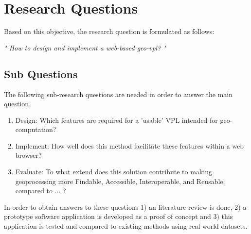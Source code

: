 \section{Research Questions}
Based on this objective, the research question is formulated as follows: 

\textit{" How to design and implement a web-based geo-vpl? "} %


\subsection*{Sub Questions}
The following sub-research questions are needed in order to answer the main question. 

\begin{enumerate}[a]
  \item Design: Which features are required for a 'usable' VPL intended for geo-computation? 
  \item Implement: How well does this method facilitate these features within a web browser?
  \item Evaluate: To what extend does this solution contribute to making geoprocessing more Findable, Accessible, Interoperable, and Reusable, compared to ... ?  
\end{enumerate}

In order to obtain answers to these questions 
1) an literature review is done, 
2) a prototype software application is developed as a proof of concept and 
3) this application is tested and compared to existing methods using real-world datasets.





